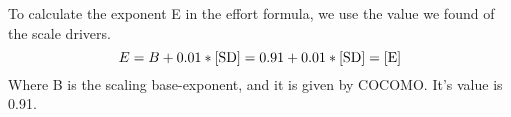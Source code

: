 To calculate the exponent E in the effort formula, we use the value we found of the scale drivers.
\begin{equation}
    E = B + 0.01 * \ref{SD} = 0.91 + 0.01 * \ref{SD} = \manuallabel{E}{1.066}\ref{E}
\end{equation}
Where B is the scaling base-exponent, and it is given by COCOMO. It's value is 0.91.